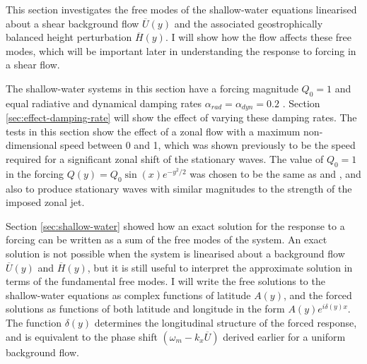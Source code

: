 
This section investigates the free modes of the shallow-water equations linearised about a shear background flow $\overline{U}(y)$ and the associated geostrophically balanced height perturbation $\overline{H}(y)$. I will show how the flow affects these free modes, which will be important later in understanding the response to forcing in a shear flow.


The shallow-water systems in this section have a forcing magnitude $Q_{0}=1$ and equal radiative and dynamical damping rates $\alpha_{rad}=\alpha_{dyn} = 0.2$ \citep{matsuno1966quasi}. Section \ref{sec:effect-damping-rate} will show the effect of varying these damping rates. The tests in this section show the effect of a zonal flow with a maximum non-dimensional speed between 0 and 1, which was shown previously to be the speed required for a significant zonal shift of the stationary waves. The value of $Q_{0}=1$ in the forcing $Q(y)=Q_{0}\sin(x)e^{-y^{2}/2}$ was chosen to be the same as \citet{matsuno1966quasi} and \citet{showman2011superrotation}, and also to produce stationary waves with similar magnitudes to the strength of the imposed zonal jet.

%

Section \ref{sec:shallow-water} showed how an exact solution for the response to a forcing can be written as a sum of the free modes of the system. An exact solution is not possible when the system is linearised about a background flow $\overline{U}(y)$ and $\overline{H}(y)$, but it is still useful to interpret the approximate solution in terms of the fundamental free modes. I will write the free solutions to the shallow-water equations as complex functions of latitude $A(y)$, and the forced solutions as functions of both latitude and longitude in the form $A(y) e^{i \delta(y) x}$. The function $\delta(y)$ determines the longitudinal structure of the forced response, and is equivalent to the phase shift $(\omega_{m} - k_{x} \overline{U})$ derived earlier for a uniform background flow.

